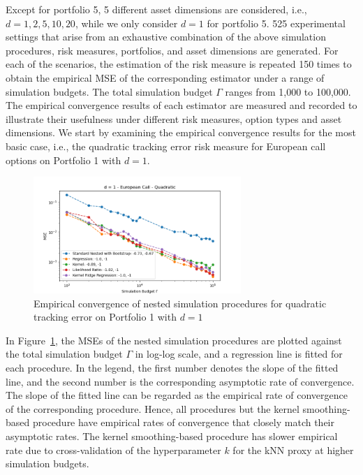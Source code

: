 \documentclass{article}
\begin{document}
Except for portfolio 5, 5 different asset dimensions are considered, i.e., $d = 1, 2, 5, 10, 20$, while we only consider $d=1$ for portfolio 5. 
525 experimental settings that arise from an exhaustive combination of the above simulation procedures, risk measures, portfolios, and asset dimensions are generated.
For each of the scenarios, the estimation of the risk measure is repeated 150 times to obtain the empirical MSE of the corresponding estimator under a range of simulation budgets.
The total simulation budget $\Gamma$ ranges from 1,000 to 100,000.
The empirical convergence results of each estimator are measured and recorded to illustrate their usefulness under different risk measures, option types and asset dimensions.
We start by examining the empirical convergence results for the most basic case, i.e., the quadratic tracking error risk measure for European call options on Portfolio 1 with $d = 1$.

\begin{figure}[ht!]
    \centering
    \includegraphics[width=0.7\textwidth]{./figures/convergence/5103.png}
    \caption{Empirical convergence of nested simulation procedures for quadratic tracking error on Portfolio 1 with $d=1$}
    \label{fig:5103} 
\end{figure}
In Figure~\ref{fig:5103}, the MSEs of the nested simulation procedures are plotted against the total simulation budget $\Gamma$ in log-log scale, and a regression line is fitted for each procedure.
In the legend, the first number denotes the slope of the fitted line, and the second number is the corresponding asymptotic rate of convergence.
The slope of the fitted line can be regarded as the empirical rate of convergence of the corresponding procedure.
Hence, all procedures but the kernel smoothing-based procedure have empirical rates of convergence that closely match their asymptotic rates. 
The kernel smoothing-based procedure has slower empirical rate due to cross-validation of the hyperparameter $k$ for the kNN proxy at higher simulation budgets.
\end{document}
